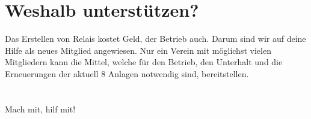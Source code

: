 \documentclass[a4paper,12pt,smallheadings]{scrartcl}
\begin{document}
\section*{Weshalb unterstützen?}
Das Erstellen von Relais kostet Geld, der Betrieb auch. Darum sind wir auf
deine Hilfe als neues Mitglied angewiesen. Nur ein Verein mit möglichst vielen
Mitgliedern kann die Mittel, welche für den Betrieb, den Unterhalt und die
Erneuerungen der aktuell 8 Anlagen notwendig sind, bereitstellen.

\section*{}\vspace{-1cm}

Mach mit, hilf mit!
\end{document}
